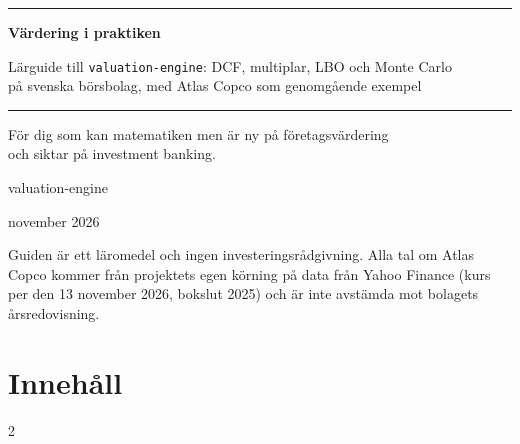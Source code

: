 \documentclass[10pt,a4paper,titlepage=true]{scrartcl}
\begin{document}

\begin{titlepage}
  \thispagestyle{empty}
  \vspace*{3.2cm}
  {\color{accent}\rule{\linewidth}{2.2pt}}\par
  \vspace{0.9cm}
  {\sffamily\bfseries\color{accent}\fontsize{32}{38}\selectfont Värdering i praktiken\par}
  \vspace{0.6cm}
  {\sffamily\fontsize{15}{20}\selectfont\color{black!75}
   Lärguide till \texttt{valuation-engine}: DCF, multiplar, LBO och Monte Carlo\\
   på svenska börsbolag, med Atlas Copco som genomgående exempel\par}
  \vspace{0.9cm}
  {\color{accent}\rule{\linewidth}{0.6pt}}\par
  \vspace{1.2cm}
  {\large För dig som kan matematiken men är ny på företagsvärdering\\
   och siktar på investment banking.\par}
  \vfill
  {\sffamily\large valuation-engine\par}
  \vspace{0.2cm}
  { november 2026\par}
  \vspace{1.2cm}
  {\small\color{black!65} Guiden är ett läromedel och ingen investeringsrådgivning. Alla tal om
   Atlas Copco kommer från projektets egen körning på data från Yahoo Finance (kurs per den
   13 november 2026, bokslut 2025) och är inte avstämda mot bolagets årsredovisning.\par}
\end{titlepage}

\section*{Innehåll}
\begingroup
  \small\setlength{\columnsep}{2.2em}\setlength{\parskip}{0pt}
  \begin{multicols}{2}
    \makeatletter{}\makeatother
  \end{multicols}
\endgroup
\clearpage











\end{document}
